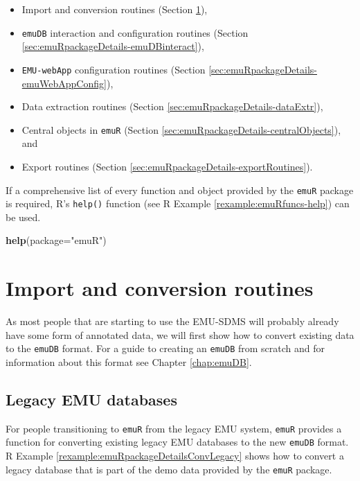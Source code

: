 \documentclass[]{book}
\newenvironment{Shaded}{\begin{snugshade}}{\end{snugshade}}
\newcommand{\DataTypeTok}[1]{\textcolor[rgb]{0.13,0.29,0.53}{#1}}
\newcommand{\KeywordTok}[1]{\textcolor[rgb]{0.13,0.29,0.53}{\textbf{#1}}}
\newcommand{\NormalTok}[1]{#1}
\newcommand{\StringTok}[1]{\textcolor[rgb]{0.31,0.60,0.02}{#1}}
\providecommand{\tightlist}{%
  \setlength{\itemsep}{0pt}\setlength{\parskip}{0pt}}
\theoremstyle{definition}
\theoremstyle{definition}
\theoremstyle{definition}
\theoremstyle{remark}
\begin{document}
\begin{itemize}
\tightlist
\item
  Import and conversion routines (Section
  \ref{sec:emuRpackageDetails-importRoutines}),
\item
  \texttt{emuDB} interaction and configuration routines (Section
  \ref{sec:emuRpackageDetails-emuDBinteract}),
\item
  \texttt{EMU-webApp} configuration routines (Section
  \ref{sec:emuRpackageDetails-emuWebAppConfig}),
\item
  Data extraction routines (Section
  \ref{sec:emuRpackageDetails-dataExtr}),
\item
  Central objects in \texttt{emuR} (Section
  \ref{sec:emuRpackageDetails-centralObjects}), and
\item
  Export routines (Section \ref{sec:emuRpackageDetails-exportRoutines}).
\end{itemize}

If a comprehensive list of every function and object provided by the
\texttt{emuR} package is required, R's \texttt{help()} function (see R
Example \ref{rexample:emuRfuncs-help}) can be used.

\begin{Shaded}
\begin{Highlighting}[]
\KeywordTok{help}\NormalTok{(}\DataTypeTok{package=}\StringTok{"emuR"}\NormalTok{)}
\end{Highlighting}
\end{Shaded}

\hypertarget{sec:emuRpackageDetails-importRoutines}{%
\section{Import and conversion
routines}\label{sec:emuRpackageDetails-importRoutines}}

As most people that are starting to use the EMU-SDMS will probably
already have some form of annotated data, we will first show how to
convert existing data to the \texttt{emuDB} format. For a guide to
creating an \texttt{emuDB} from scratch and for information about this
format see Chapter \ref{chap:emuDB}.

\hypertarget{legacy-emu-databases}{%
\subsection{Legacy EMU databases}\label{legacy-emu-databases}}

For people transitioning to \texttt{emuR} from the legacy EMU system,
\texttt{emuR} provides a function for converting existing legacy EMU
databases to the new \texttt{emuDB} format. R Example
\ref{rexample:emuRpackageDetailsConvLegacy} shows how to convert a
legacy database that is part of the demo data provided by the
\texttt{emuR} package.
\end{document}
